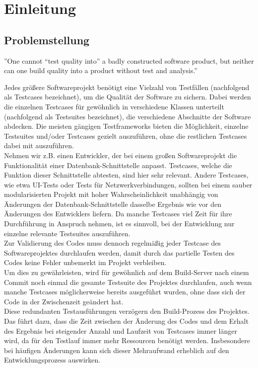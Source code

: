 \chapter{Einleitung}\label{chap:introduction}
\section{Problemstellung}
''One cannot “test quality into” a badly constructed software product, but neither can one
build quality into a product without test and analysis.''\\
\textcite[XVII]{PezzeYoung}

Jedes größere Softwareprojekt benötigt eine Vielzahl von Testfällen (nachfolgend als Testcases bezeichnet), um die Qualität der Software zu sichern. Dabei werden die einzelnen Testcases für gewöhnlich in verschiedene Klassen unterteilt (nachfolgend als Testsuites bezeichnet), die verschiedene Abschnitte der Software abdecken. Die meisten gängigen Testframeworks bieten die Möglichkeit, einzelne Testsuites und/oder Testcases gezielt auszuführen, ohne die restlichen Testcases dabei mit auszuführen.\\
Nehmen wir z.B. einen Entwickler, der bei einem großen Softwareprojekt die Funktionalität einer Datenbank-Schnittstelle anpasst. Testcases, welche die Funktion dieser Schnittstelle abtesten, sind hier sehr relevant. Andere Testcases, wie etwa UI-Tests oder Tests für Netzwerkverbindungen, sollten bei einem sauber modularisierten Projekt mit hoher Wahrscheinlichkeit unabhängig von Änderungen der Datenbank-Schnittstelle dasselbe Ergebnis wie vor den Änderungen des Entwicklers liefern. Da manche Testcases viel Zeit für ihre Durchführung in Anspruch nehmen, ist es sinnvoll, bei der Entwicklung nur einzelne relevante Testsuites auszuführen.\\ 
Zur Validierung des Codes muss dennoch regelmäßig jeder Testcase des Softwareprojektes durchlaufen werden, damit durch das partielle Testen des Codes keine Fehler unbemerkt im Projekt verbleiben.\\
Um dies zu gewährleisten, wird für gewöhnlich auf dem Build-Server nach einem Commit noch einmal die gesamte Testsuite des Projektes durchlaufen, auch wenn manche Testcases möglicherweise bereits ausgeführt wurden, ohne dass sich der Code in der Zwischenzeit geändert hat.\\
Diese redundanten Testausführungen verzögern den Build-Prozess des Projektes. Das führt dazu, dass die Zeit zwischen der Änderung des Codes und dem Erhalt des Ergebnis bei steigender Anzahl und Laufzeit von Testcases immer länger wird, da für den Testlauf immer mehr Ressourcen benötigt werden. Insbesondere bei häufigen Änderungen kann sich dieser Mehraufwand erheblich auf den Entwicklungsprozess auswirken.\\
